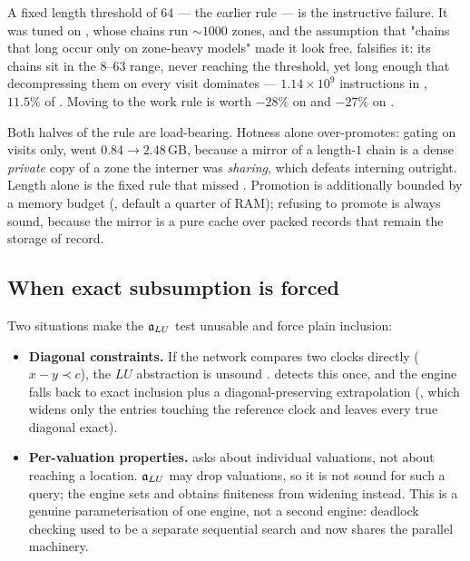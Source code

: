 \begin{itemize}[leftmargin=1.2em, itemsep=2pt]
      A fixed length threshold of $64$ --- the earlier rule --- is the
      instructive failure.  It was tuned on , whose chains run
      $\sim1000$ zones, and the assumption that "chains that long occur only on
      zone-heavy models" made it look free.   falsifies it: its chains
      sit in the $8$--$63$ range, never reaching the threshold, yet long enough
      that decompressing them on every visit dominates --- $1.14 \times 10^9$
      instructions in , $11.5\%$ of .  Moving to
      the work rule is worth $-28\%$ on  and $-27\%$ on .

      Both halves of the rule are load-bearing.  Hotness alone over-promotes:
      gating on visits only,  went $0.84 \to 2.48$\,GB, because a
      mirror of a length-$1$ chain is a dense \emph{private} copy of a zone the
      interner was \emph{sharing}, which defeats interning outright.  Length
      alone is the fixed rule that missed .  Promotion is additionally
      bounded by a memory budget (, default a quarter of
      RAM); refusing to promote is always sound, because the mirror is a pure
      cache over packed records that remain the storage of record.
\end{itemize}

\subsection{When exact subsumption is forced}

Two situations make the $\mathfrak{a}_{LU}$ test unusable and force plain inclusion:

\begin{itemize}[leftmargin=1.2em, itemsep=2pt]
\item \textbf{Diagonal constraints.}  If the network compares two clocks
      directly ($x - y \prec c$), the $LU$ abstraction is unsound
      \cite{Bouyer04}.   detects this once, and the
      engine falls back to exact inclusion plus a diagonal-preserving
      extrapolation (, which widens only
      the entries touching the reference clock and leaves every true diagonal
      exact).

\item \textbf{Per-valuation properties.}   asks about
      individual valuations, not about reaching a location.  $\mathfrak{a}_{LU}$ may drop
      valuations, so it is not sound for such a query; the engine sets
       and obtains finiteness from widening instead.  This is
      a genuine parameterisation of one engine, not a second engine: deadlock
      checking used to be a separate sequential search and now shares the
      parallel machinery.
\end{itemize}

